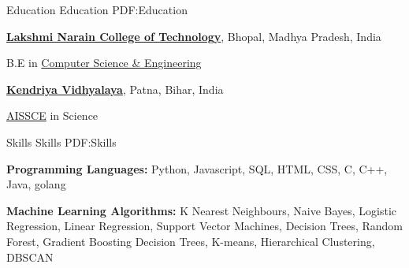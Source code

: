 \documentclass[letterpaper,MMMyyyy,nonstopmode]{simpleresumecv}
\begin{document}
        \begin{Body}
        
        
            \Section
            {Education}
            {Education}
            {PDF:Education}
            
                \Entry
                    \href{http://http://www.lnctgroup.in/LNCT}
                    {\textbf{Lakshmi Narain College of Technology}},
                    Bhopal, Madhya Pradesh, India
                    
                    \Gap

                    \BulletItem
                        B.E in 
                        \href{http://www.lnctgroup.in/Bachelor-Of-Engineering/Computer-Science-Engineering}
                            {Computer Science \& Engineering}
                        
                
                
                \BigGap


                \Entry
                    \href{http://http://kvkankarbaghpatna.org.in/}
                    {\textbf{Kendriya Vidhyalaya}},
                    Patna, Bihar, India
                    
                    \Gap

                    \BulletItem
                        \href{http://cbse.nic.in/newsite/index.html}
                            {AISSCE}
                            in Science                

                \BigGap                    
            
            
            \Section
            {Skills}
            {Skills}
            {PDF:Skills}
            
            
                \Entry
                    \textbf{Programming Languages:}
                    Python, Javascript, SQL, HTML, CSS, C, C++, Java, golang
                
                    
                \BigGap

                    
                \Entry
                    \textbf{Machine Learning Algorithms:}
                    K Nearest Neighbours, Naive Bayes, Logistic Regression, 
                    Linear Regression, Support Vector Machines, Decision Trees, 
                    Random Forest, Gradient Boosting Decision Trees, K-means, 
                    Hierarchical Clustering, DBSCAN
                

\end{Body}
\end{document}
